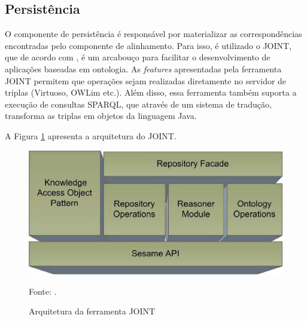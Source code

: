 \subsection{Persistência}
O componente de persistência é responsável por materializar as correspondências encontradas pelo componente de alinhamento. Para isso, é utilizado o JOINT, que de acordo com , é um arcabouço para facilitar o desenvolvimento de aplicações baseadas em ontologia. As \textit{features} apresentadas pela ferramenta JOINT permitem que operações sejam realizadas diretamente no servidor de triplas (Virtuoso, OWLim etc.). Além disso, essa ferramenta também suporta a execução de consultas SPARQL, que através de um sistema de tradução, transforma as triplas em objetos da linguagem Java.

A Figura \ref{fig:joint} apresenta a arquitetura do JOINT.

\begin{figure}[!ht]
	\centering
	\includegraphics[width=1\textwidth]{./imagens/joint.png}
	\caption{Arquitetura da ferramenta JOINT}
	\footnotesize{Fonte: \cite{holanda2013joint}.}
	\label{fig:joint}
\end{figure}
